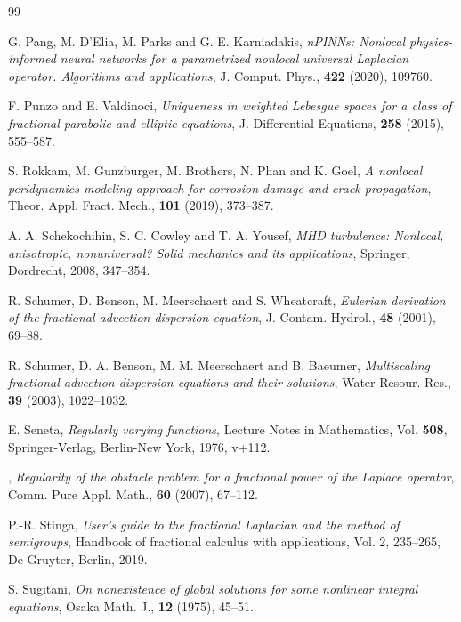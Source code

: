 \documentclass[12pt,reqno]{amsart}
\theoremstyle{plain}
\theoremstyle{definition}
\theoremstyle{remark}
\numberwithin{equation}{section}
\begin{document}
\begin{thebibliography}{99}

 G. Pang, M. D'Elia, M. Parks and G. E. Karniadakis, {\em nPINNs: Nonlocal physics-informed neural networks for a parametrized nonlocal universal Laplacian operator. Algorithms and applications}, J. Comput. Phys., {\bf 422} (2020), 109760.  

 {F. Punzo and E. Valdinoci}, {\em Uniqueness in weighted {L}ebesgue spaces for a class of fractional parabolic and elliptic equations}, {J. Differential Equations}, {\bf 258} (2015), {555--587}.

 



 S. Rokkam, M. Gunzburger, M. Brothers, N. Phan and K. Goel, {\em A nonlocal peridynamics modeling approach for corrosion damage and crack propagation}, Theor. Appl. Fract. Mech., {\bf 101} (2019), 373--387. 


 A. A. Schekochihin, S. C. Cowley and T. A. Yousef,  {\em MHD turbulence: Nonlocal, anisotropic, nonuniversal? Solid mechanics and its applications}, Springer, Dordrecht, 2008, 347--354. 

 R. Schumer, D. Benson, M. Meerschaert and S. Wheatcraft, {\em Eulerian derivation of the fractional advection-dispersion equation}, J. Contam. Hydrol., {\bf 48} (2001), 69--88.  

 R. Schumer, D. A. Benson, M. M. Meerschaert and B. Baeumer, {\em Multiscaling fractional advection-dispersion equations and their solutions}, Water Resour. Res., {\bf 39} (2003), 1022--1032. 


 {E. Seneta}, {\em Regularly varying functions}, {Lecture Notes in Mathematics}, {Vol. {\bf 508}}, {Springer-Verlag, Berlin-New York}, {1976}, {v+112}.

 , {\em Regularity of the obstacle problem for a fractional power of
              the {L}aplace operator}, {Comm. Pure Appl. Math.}, {\bf 60} (2007), {67--112}.

 P.-R. Stinga, {\em User's guide to the fractional Laplacian and the method of semigroups}, Handbook of fractional calculus with applications, Vol. 2, 235--265, De Gruyter, Berlin, 2019.


 {S. Sugitani}, {\em On nonexistence of global solutions for some nonlinear integral equations}, {Osaka Math. J.}, {\bf 12} (1975), {45--51}.



\end{thebibliography}
\end{document}
